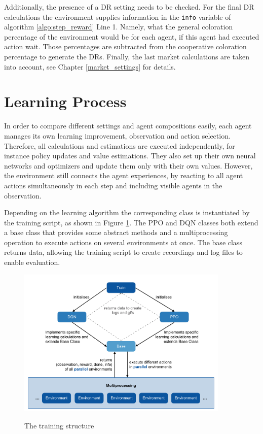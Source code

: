 Additionally, the presence of a DR setting needs to be checked. For the final DR calculations the environment supplies information in the \verb|info| variable of algorithm \ref{algo:step_reward} Line 1. Namely, what the general coloration percentage of the environment would be for each agent, if this agent had executed action wait. Those percentages are subtracted from the cooperative coloration percentage to generate the DRs. Finally, the last market calculations are taken into account, see Chapter \ref{market_settings} for details.

\section{Learning Process}\label{learning_process}
In order to compare different settings and agent compositions easily, each agent manages its own learning improvement, observation and action selection. Therefore, all calculations and estimations are executed independently, for instance policy updates and value estimations. They also set up their own neural networks and optimizers and update them only with their own values. However, the environment still connects the agent experiences, by reacting to all agent actions simultaneously in each step and including visible agents in the observation.

Depending on the learning algorithm the corresponding class is instantiated by the training script, as shown in Figure \ref{fig:training}. The PPO and DQN classes both extend a base class that provides some abstract methods and a multiprocessing operation to execute actions on several environments at once. The base class returns data, allowing the training script to create recordings and log files to enable evaluation.

\begin{figure}[hpbt]
    \centering
    \includegraphics[width=0.9\textwidth]{pictures/training}\\
    \caption[The Training Structure]{The training structure}\label{fig:training}
\end{figure}

